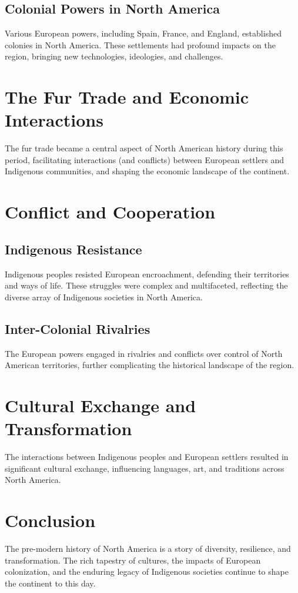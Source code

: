 \documentclass[a4paper,12pt]{book}
\begin{document}
\subsection{Colonial Powers in North America}
Various European powers, including Spain, France, and England, established colonies in North America. These settlements had profound impacts on the region, bringing new technologies, ideologies, and challenges.

\section{The Fur Trade and Economic Interactions}
\label{sec:fur-trade-economic-interactions}
The fur trade became a central aspect of North American history during this period, facilitating interactions (and conflicts) between European settlers and Indigenous communities, and shaping the economic landscape of the continent.

\section{Conflict and Cooperation}
\label{sec:conflict-cooperation}

\subsection{Indigenous Resistance}
Indigenous peoples resisted European encroachment, defending their territories and ways of life. These struggles were complex and multifaceted, reflecting the diverse array of Indigenous societies in North America.

\subsection{Inter-Colonial Rivalries}
The European powers engaged in rivalries and conflicts over control of North American territories, further complicating the historical landscape of the region.

\section{Cultural Exchange and Transformation}
\label{sec:cultural-exchange-transformation}
The interactions between Indigenous peoples and European settlers resulted in significant cultural exchange, influencing languages, art, and traditions across North America.

\section{Conclusion}
\label{sec:conclusion-north-america}
The pre-modern history of North America is a story of diversity, resilience, and transformation. The rich tapestry of cultures, the impacts of European colonization, and the enduring legacy of Indigenous societies continue to shape the continent to this day.
\end{document}
